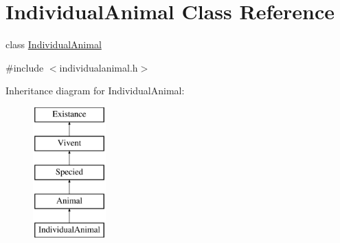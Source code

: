 \hypertarget{classIndividualAnimal}{
\section{IndividualAnimal Class Reference}
\label{classIndividualAnimal}
}


class \hyperlink{classIndividualAnimal}{IndividualAnimal}  




{\ttfamily \#include $<$individualanimal.h$>$}

Inheritance diagram for IndividualAnimal:\begin{figure}[H]
\begin{center}
\leavevmode
\includegraphics[height=5.000000cm]{classIndividualAnimal}
\end{center}
\end{figure}
